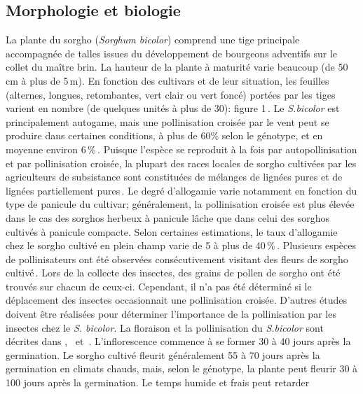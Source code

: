 \documentclass[a4paper,11pt]{article}
\begin{document}
\subsection{Morphologie et biologie} La plante du sorgho
(\emph{Sorghum bicolor}) comprend une tige principale accompagnée de
talles issues du développement de bourgeons adventifs sur le collet du
maître brin. La hauteur de la plante à maturité varie beaucoup (de
50\,cm à plus de 5\,m). En fonction des cultivars et de leur
situation, les feuilles (alternes, longues, retombantes, vert clair ou
vert foncé) portées par les tiges varient en nombre (de quelques
unités à plus de 30): figure 1\,\cite{BARRO_KONDOMBO_2010}. Le
\emph{S.bicolor} est principalement autogame, mais une pollinisation
croisée par le vent peut se produire dans certaines conditions, à plus
de 60\% selon le génotype, et en moyenne environ
6\,\%\,\cite{Ellstrand_1983,
  House85,Pedersen_1998,Schertz_1980}. Puisque l’espèce se reproduit à
la fois par autopollinisation et par pollinisation croisée, la plupart
des races locales de sorgho cultivées par les agriculteurs de
subsistance sont constituées de mélanges de lignées pures et de
lignées partiellement pures\,\cite{SINGH_1997}. Le degré d’allogamie
varie notamment en fonction du type de panicule du cultivar;
généralement, la pollinisation croisée est plus élevée dans le cas des
sorghos herbeux à panicule lâche que dans celui des sorghos cultivés à
panicule compacte. Selon certaines estimations, le taux d’allogamie
chez le sorgho cultivé en plein champ varie de 5 à plus de
40\,\%\,\cite{Barnaud_2008, DJE_2004, Doggett_1988,
  Ellstrand_1983,Schmidt_2006}. Plusieurs espèces de pollinisateurs
ont été observées consécutivement visitant des fleurs de sorgho
cultivé\,\cite{Immelman_2000, Schmidt_2006}. Lors de la collecte des
insectes, des grains de pollen de sorgho ont été trouvés sur chacun de
ceux-ci. Cependant, il n’a pas été déterminé si le déplacement des
insectes occasionnait une pollinisation croisée. D’autres études
doivent être réalisées pour déterminer l’importance de la
pollinisation par les insectes chez le \emph{S. bicolor}. La floraison
et la pollinisation du \emph{S.bicolor} sont décrites
dans\,\citeauthor{House85}\,\citeyear{House85},
\citeauthor{SINGH_1997} \,\citeyear{SINGH_1997} et
\citeauthor{SRINIVASA_2013}\,\citeyear{SRINIVASA_2013}. L’inflorescence
commence à se former 30 à 40 jours après la germination. Le sorgho
cultivé fleurit généralement 55 à 70 jours après la germination en
climats chauds, mais, selon le génotype, la plante peut fleurir 30 à
100 jours après la germination. Le temps humide et frais peut retarder
\end{document}
